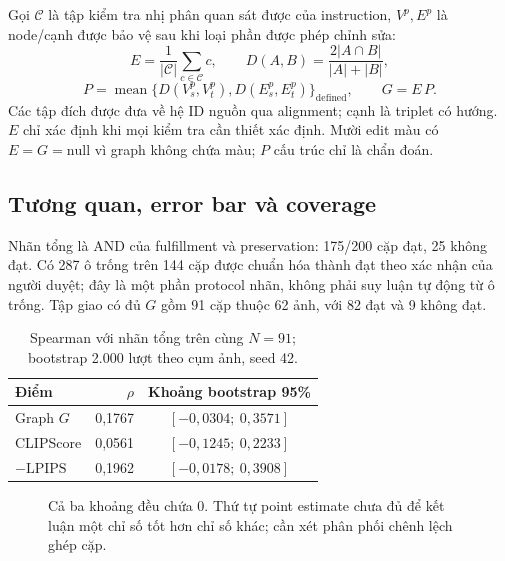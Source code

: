 Gọi $\mathcal C$ là tập kiểm tra nhị phân quan sát được của instruction,
$V^p,E^p$ là node/cạnh được bảo vệ sau khi loại phần được phép chỉnh sửa:
\[
E=\frac{1}{|\mathcal C|}\sum_{c\in\mathcal C}c,\qquad
D(A,B)=\frac{2|A\cap B|}{|A|+|B|},
\]
\[
P=\operatorname{mean}\{D(V_s^p,V_t^p),D(E_s^p,E_t^p)\}_{\mathrm{defined}},
\qquad G=E\,P.
\]
Các tập đích được đưa về hệ ID nguồn qua alignment; cạnh là triplet có hướng.
$E$ chỉ xác định khi mọi kiểm tra cần thiết xác định. Mười edit màu có
$E=G=\mathrm{null}$ vì graph không chứa màu; $P$ cấu trúc chỉ là chẩn đoán.

\clearpage
\subsection{Tương quan, error bar và coverage}
Nhãn tổng là AND của fulfillment và preservation: 175/200 cặp đạt, 25 không đạt.
Có 287 ô trống trên 144 cặp được chuẩn hóa thành đạt theo xác nhận của người duyệt;
đây là một phần protocol nhãn, không phải suy luận tự động từ ô trống.
Tập giao có đủ $G$ gồm 91 cặp thuộc 62 ảnh, với 82 đạt và 9 không đạt.

\begin{table}[H]\centering\small
\caption{Spearman với nhãn tổng trên cùng $N=91$; bootstrap 2.000 lượt theo cụm ảnh, seed 42.}\label{tab:corr}
\begin{tabular}{@{}lrc@{}}\toprule
Điểm & $\rho$ & Khoảng bootstrap 95\%\\\midrule
Graph $G$ & 0,1767 & $[-0,0304;\ 0,3571]$\\
CLIPScore & 0,0561 & $[-0,1245;\ 0,2233]$\\
$-\mathrm{LPIPS}$ & 0,1962 & $[-0,0178;\ 0,3908]$\\
\bottomrule\end{tabular}\end{table}

\begin{figure}[H]\centering
{}
\caption{Cả ba khoảng đều chứa 0. Thứ tự point estimate chưa đủ để kết luận
một chỉ số tốt hơn chỉ số khác; cần xét phân phối chênh lệch ghép cặp.}
\end{figure}

